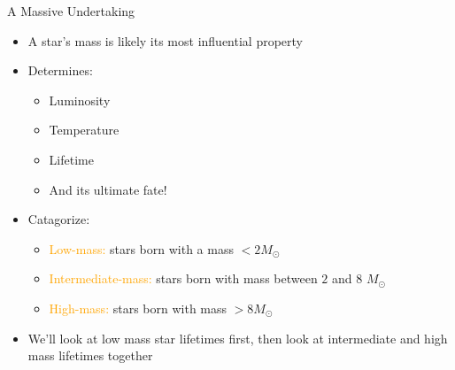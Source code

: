 \documentclass[pdf,aspectratio=169]{beamer}
\begin{document}
\begin{frame}{A Massive Undertaking}
  \begin{itemize}
	\item A star's mass is likely its most influential property
	\item Determines:
	  \begin{itemize}
		\item Luminosity
		\item Temperature
		\item Lifetime
		\item \alert{And its ultimate fate!}
	  \end{itemize}
	\item Catagorize:
	  \begin{itemize}
		\item \textcolor{orange}{Low-mass:} stars born with a mass $<2M_\odot$
		\item \textcolor{orange}{Intermediate-mass:} stars born with mass between $2$ and $8$ $M_\odot$
		\item \textcolor{orange}{High-mass:} stars born with mass $>8 M_\odot$
	  \end{itemize}
	\item<2> \alert{We'll look at low mass star lifetimes first, then look at intermediate and high mass lifetimes together}
  \end{itemize}
\end{frame}

\end{document}
